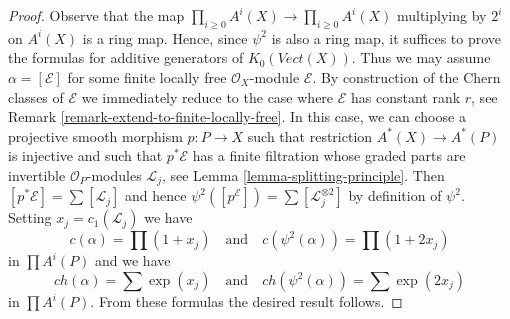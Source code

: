 \documentclass[10pt,a4paper]{amsart}
\theoremstyle{plain}
\theoremstyle{definition}
\theoremstyle{remark}
\numberwithin{equation}{subsection}
\begin{document}
\begin{proof}
Observe that the map $\prod_{i \geq 0} A^i(X) \to \prod_{i \geq 0} A^i(X)$
multiplying by $2^i$ on $A^i(X)$ is a ring map. Hence, since $\psi^2$
is also a ring map, it suffices to prove the formulas for additive generators
of $K_0(\textit{Vect}(X))$. Thus we may assume $\alpha = [\mathcal{E}]$
for some finite locally free $\mathcal{O}_X$-module $\mathcal{E}$.
By construction of the Chern classes of $\mathcal{E}$ we immediately
reduce to the case where $\mathcal{E}$ has constant rank $r$, see
Remark \ref{remark-extend-to-finite-locally-free}.
In this case, we can choose a projective smooth morphism $p : P \to X$
such that restriction $A^*(X) \to A^*(P)$ is injective
and such that $p^*\mathcal{E}$ has a finite filtration whose
graded parts are invertible $\mathcal{O}_P$-modules $\mathcal{L}_j$, see
Lemma \ref{lemma-splitting-principle}. Then
$[p^*\mathcal{E}] = \sum [\mathcal{L}_j]$ and hence
$\psi^2([p^\mathcal{E}]) = \sum [\mathcal{L}_j^{\otimes 2}]$
by definition of $\psi^2$. Setting $x_j  = c_1(\mathcal{L}_j)$
we have
$$
c(\alpha) = \prod (1 + x_j)
\quad\text{and}\quad
c(\psi^2(\alpha)) = \prod (1 + 2 x_j)
$$
in $\prod A^i(P)$ and we have
$$
ch(\alpha) = \sum \exp(x_j)
\quad\text{and}\quad
ch(\psi^2(\alpha)) = \sum \exp(2 x_j)
$$
in $\prod A^i(P)$. From these formulas the desired result follows.
\end{proof}
\end{document}
